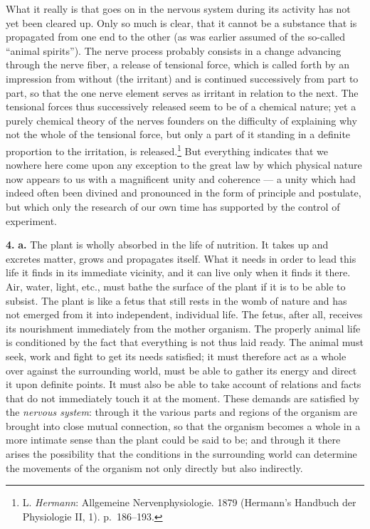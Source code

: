 \documentclass[12pt,a4paper]{book}
\newcommand{\opage}[1]{\marginnote{\footnotesize\textit{[#1]}}}
\begin{document}
What it really is that goes on in the nervous system during its
activity has not yet been cleared up. Only so much is clear, that it
cannot be a substance that is propagated from one end to the other (as
was earlier assumed of the so-called ``animal spirits''). The nerve
process probably consists in a change advancing through the nerve
fiber, a release of tensional force, which is called forth by an
impression from without (the irritant) and is continued successively
from part to part, so that the one nerve element serves as irritant in
relation to the next. The tensional forces thus successively released
seem to be of a chemical nature; yet a purely chemical theory of the
nerves founders on the difficulty of explaining why not the whole of
the tensional force, but only a part of it standing in a definite
proportion to the irritation, is released.\footnote{L. \emph{Hermann}:
Allgemeine Nervenphysiologie. 1879 (Hermann's Handbuch der Physiologie
II, 1). p.~186--193.} But everything indicates that we nowhere here
come upon any exception to the great law by which physical nature now
appears to us with a magnificent unity and coherence --- a unity which
had indeed often been divined and pronounced in the form of principle
and postulate, but which only the research of our own time has
supported by the control of experiment.

\textbf{4.} \textbf{a.} The plant is wholly absorbed in the life of
nutrition. It takes up and excretes matter, grows and propagates itself.
What it needs in order to lead this life it finds in its immediate
vicinity, and it can live only when it finds it there. Air, water,
light, etc., must bathe the surface of the plant if it is to be able to
subsist. The plant is like a fetus that still rests in the womb of
nature and has not emerged from it into independent, individual life.
The fetus, after all, receives its
\opage{45}nourishment immediately from the mother organism. The properly
animal life is conditioned by the fact that everything is not thus laid
ready. The animal must seek, work and fight to get its needs satisfied;
it must therefore act as a whole over against the surrounding world,
must be able to gather its energy and direct it upon definite points.
It must also be able to take account of relations and facts that do not
immediately touch it at the moment. These demands are satisfied by the
\emph{nervous system}: through it the various parts and regions of the
organism are brought into close mutual connection, so that the organism
becomes a whole in a more intimate sense than the plant could be said
to be; and through it there arises the possibility that the conditions
in the surrounding world can determine the movements of the organism
not only directly but also indirectly.
\end{document}
